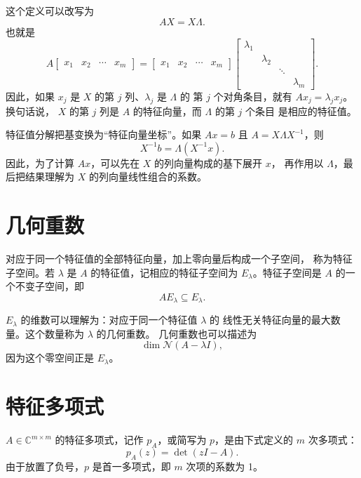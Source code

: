 \documentclass[UTF8,fontset=none,12pt]{ctexart}
\begin{document}
这个定义可以改写为
\begin{equation}
AX=X\Lambda.
\tag{24.3}
\end{equation}
也就是
\[
A
\begin{bmatrix}x_1&x_2&\cdots&x_m\end{bmatrix}
=
\begin{bmatrix}x_1&x_2&\cdots&x_m\end{bmatrix}
\begin{bmatrix}
\lambda_1&&&\\
&\lambda_2&&\\
&&\ddots&\\
&&&\lambda_m
\end{bmatrix}.
\]
因此，如果 $x_j$ 是 $X$ 的第 $j$ 列、$\lambda_j$ 是 $\Lambda$ 的
第 $j$ 个对角条目，就有 $Ax_j=\lambda_jx_j$。换句话说，
$X$ 的第 $j$ 列是 $A$ 的特征向量，而 $\Lambda$ 的第 $j$ 个条目
是相应的特征值。

特征值分解把基变换为“特征向量坐标”。如果 $Ax=b$ 且
$A=X\Lambda X^{-1}$，则
\begin{equation}
X^{-1}b=\Lambda(X^{-1}x).
\tag{24.4}
\end{equation}
因此，为了计算 $Ax$，可以先在 $X$ 的列向量构成的基下展开 $x$，
再作用以 $\Lambda$，最后把结果理解为 $X$ 的列向量线性组合的系数。

\section*{几何重数}

对应于同一个特征值的全部特征向量，加上零向量后构成一个子空间，
称为特征子空间。若 $\lambda$ 是 $A$ 的特征值，记相应的特征子空间为
$E_\lambda$。特征子空间是 $A$ 的一个不变子空间，即
\[
AE_\lambda\subseteq E_\lambda.
\]

$E_\lambda$ 的维数可以理解为：对应于同一个特征值 $\lambda$ 的
线性无关特征向量的最大数量。这个数量称为 $\lambda$ 的几何重数。
几何重数也可以描述为
\[
\dim\mathcal{N}(A-\lambda I),
\]
因为这个零空间正是 $E_\lambda$。

\section*{特征多项式}

$A\in\mathbb{C}^{m\times m}$ 的特征多项式，记作 $p_A$，或简写为
$p$，是由下式定义的 $m$ 次多项式：
\begin{equation}
p_A(z)=\det(zI-A).
\tag{24.5}
\end{equation}
由于放置了负号，$p$ 是首一多项式，即 $m$ 次项的系数为 1。
\end{document}
